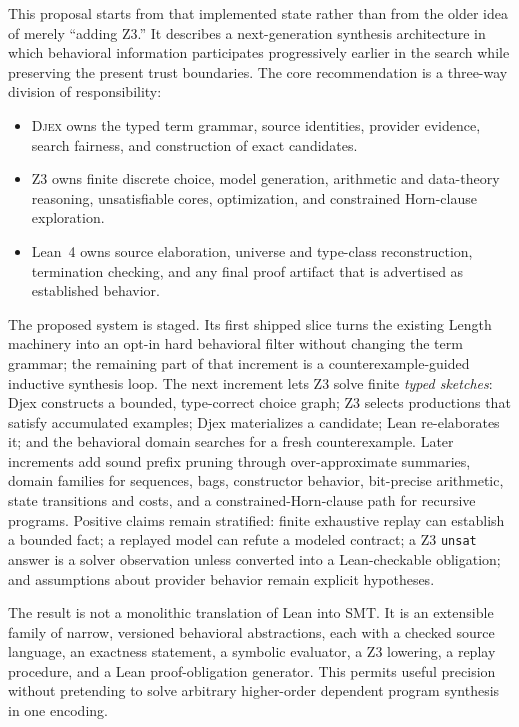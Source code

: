 \documentclass[11pt,oneside]{report}
\newcommand{\Djex}{\textsc{Djex}\xspace}
\newcommand{\Zthree}{\textsc{Z3}\xspace}
\newcommand{\Lean}{Lean~4\xspace}
\begin{document}
This proposal starts from that implemented state rather than from the older idea of merely ``adding Z3.'' It describes a next-generation synthesis architecture in which behavioral information participates progressively earlier in the search while preserving the present trust boundaries. The core recommendation is a three-way division of responsibility:

\begin{itemize}[leftmargin=2.0em]
\item \Djex owns the typed term grammar, source identities, provider evidence, search fairness, and construction of exact candidates.
\item \Zthree owns finite discrete choice, model generation, arithmetic and data-theory reasoning, unsatisfiable cores, optimization, and constrained Horn-clause exploration.
\item \Lean owns source elaboration, universe and type-class reconstruction, termination checking, and any final proof artifact that is advertised as established behavior.
\end{itemize}

The proposed system is staged. Its first shipped slice turns the existing Length machinery into an opt-in hard behavioral filter without changing the term grammar; the remaining part of that increment is a counterexample-guided inductive synthesis loop. The next increment lets \Zthree solve finite \emph{typed sketches}: Djex constructs a bounded, type-correct choice graph; Z3 selects productions that satisfy accumulated examples; Djex materializes a candidate; Lean re-elaborates it; and the behavioral domain searches for a fresh counterexample. Later increments add sound prefix pruning through over-approximate summaries, domain families for sequences, bags, constructor behavior, bit-precise arithmetic, state transitions and costs, and a constrained-Horn-clause path for recursive programs. Positive claims remain stratified: finite exhaustive replay can establish a bounded fact; a replayed model can refute a modeled contract; a Z3 \texttt{unsat} answer is a solver observation unless converted into a Lean-checkable obligation; and assumptions about provider behavior remain explicit hypotheses.

The result is not a monolithic translation of Lean into SMT. It is an extensible family of narrow, versioned behavioral abstractions, each with a checked source language, an exactness statement, a symbolic evaluator, a Z3 lowering, a replay procedure, and a Lean proof-obligation generator. This permits useful precision without pretending to solve arbitrary higher-order dependent program synthesis in one encoding.
\end{document}
